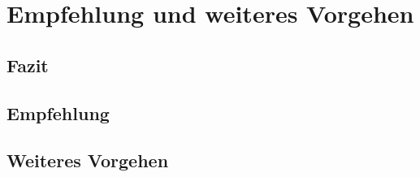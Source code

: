 \chapter{Empfehlung und weiteres Vorgehen}
\label{Empfehlung_Vorgehen}



\section{Fazit}
\label{Fazit}


\section{Empfehlung}


\section{Weiteres Vorgehen}



